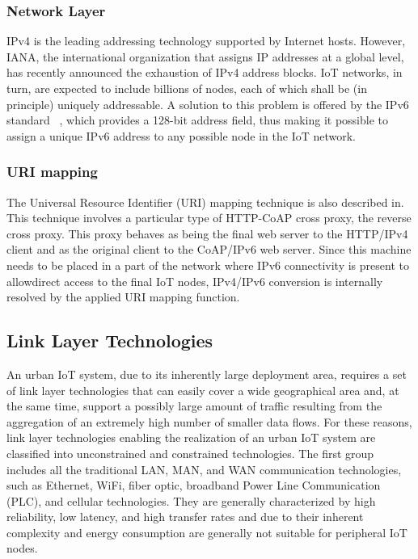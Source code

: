 \documentclass[conference,column]{IEEEtran}
\begin{document}
 \subsubsection{Network Layer}  IPv4 is the leading addressing technology supported by Internet hosts. However, IANA, the international organization that assigns IP addresses at a global level, has recently announced the exhaustion of IPv4 address blocks. IoT networks, in turn, are expected to include billions of nodes, each of which shall be (in principle) uniquely addressable. A solution to this problem is offered by the IPv6 standard ~\cite{r6}, which provides a 128-bit address field, thus making it possible to assign a unique IPv6 address to any possible node in the IoT network.

\subsubsection{URI mapping}  The Universal Resource Identifier (URI) mapping technique is also described in. This technique involves a particular type of HTTP-CoAP cross proxy, the reverse cross proxy. This proxy behaves as being the final web server to the HTTP/IPv4 client and as the original client to the CoAP/IPv6 web server. Since this machine needs to be placed in a part of the
network where IPv6 connectivity is present to allowdirect access to the final IoT nodes, IPv4/IPv6 conversion is internally resolved by the applied URI mapping function.

\subsection{Link Layer Technologies}An urban IoT system, due to its inherently large deployment area, requires a set of link layer technologies that can easily cover a wide geographical area and, at the same time, support a possibly
large amount of traffic resulting from the aggregation of an extremely high number of smaller data flows. For these reasons, link layer technologies enabling the realization of an urban IoT system are classified into unconstrained and constrained technologies. The first group includes all the traditional LAN, MAN, and WAN communication technologies, such as Ethernet, WiFi,
fiber optic, broadband Power Line Communication (PLC), and cellular technologies. They are generally characterized by high reliability, low latency, and high transfer rates and due to their inherent complexity and energy consumption are generally not suitable for peripheral IoT nodes.
\end{document}
